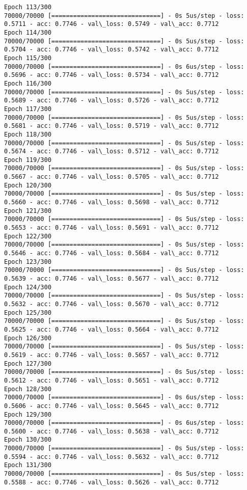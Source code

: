 \documentclass[11pt]{article}
\begin{document}
\begin{Verbatim}[commandchars=\\\{\}]
Epoch 113/300
70000/70000 [==============================] - 0s 5us/step - loss: 0.5711 - acc: 0.7746 - val\_loss: 0.5749 - val\_acc: 0.7712
Epoch 114/300
70000/70000 [==============================] - 0s 5us/step - loss: 0.5704 - acc: 0.7746 - val\_loss: 0.5742 - val\_acc: 0.7712
Epoch 115/300
70000/70000 [==============================] - 0s 6us/step - loss: 0.5696 - acc: 0.7746 - val\_loss: 0.5734 - val\_acc: 0.7712
Epoch 116/300
70000/70000 [==============================] - 0s 5us/step - loss: 0.5689 - acc: 0.7746 - val\_loss: 0.5726 - val\_acc: 0.7712
Epoch 117/300
70000/70000 [==============================] - 0s 5us/step - loss: 0.5681 - acc: 0.7746 - val\_loss: 0.5719 - val\_acc: 0.7712
Epoch 118/300
70000/70000 [==============================] - 0s 5us/step - loss: 0.5674 - acc: 0.7746 - val\_loss: 0.5712 - val\_acc: 0.7712
Epoch 119/300
70000/70000 [==============================] - 0s 5us/step - loss: 0.5667 - acc: 0.7746 - val\_loss: 0.5705 - val\_acc: 0.7712
Epoch 120/300
70000/70000 [==============================] - 0s 5us/step - loss: 0.5660 - acc: 0.7746 - val\_loss: 0.5698 - val\_acc: 0.7712
Epoch 121/300
70000/70000 [==============================] - 0s 5us/step - loss: 0.5653 - acc: 0.7746 - val\_loss: 0.5691 - val\_acc: 0.7712
Epoch 122/300
70000/70000 [==============================] - 0s 5us/step - loss: 0.5646 - acc: 0.7746 - val\_loss: 0.5684 - val\_acc: 0.7712
Epoch 123/300
70000/70000 [==============================] - 0s 5us/step - loss: 0.5639 - acc: 0.7746 - val\_loss: 0.5677 - val\_acc: 0.7712
Epoch 124/300
70000/70000 [==============================] - 0s 5us/step - loss: 0.5632 - acc: 0.7746 - val\_loss: 0.5670 - val\_acc: 0.7712
Epoch 125/300
70000/70000 [==============================] - 0s 5us/step - loss: 0.5625 - acc: 0.7746 - val\_loss: 0.5664 - val\_acc: 0.7712
Epoch 126/300
70000/70000 [==============================] - 0s 5us/step - loss: 0.5619 - acc: 0.7746 - val\_loss: 0.5657 - val\_acc: 0.7712
Epoch 127/300
70000/70000 [==============================] - 0s 5us/step - loss: 0.5612 - acc: 0.7746 - val\_loss: 0.5651 - val\_acc: 0.7712
Epoch 128/300
70000/70000 [==============================] - 0s 6us/step - loss: 0.5606 - acc: 0.7746 - val\_loss: 0.5645 - val\_acc: 0.7712
Epoch 129/300
70000/70000 [==============================] - 0s 6us/step - loss: 0.5600 - acc: 0.7746 - val\_loss: 0.5638 - val\_acc: 0.7712
Epoch 130/300
70000/70000 [==============================] - 0s 5us/step - loss: 0.5594 - acc: 0.7746 - val\_loss: 0.5632 - val\_acc: 0.7712
Epoch 131/300
70000/70000 [==============================] - 0s 5us/step - loss: 0.5588 - acc: 0.7746 - val\_loss: 0.5626 - val\_acc: 0.7712

\end{Verbatim}
\end{document}
